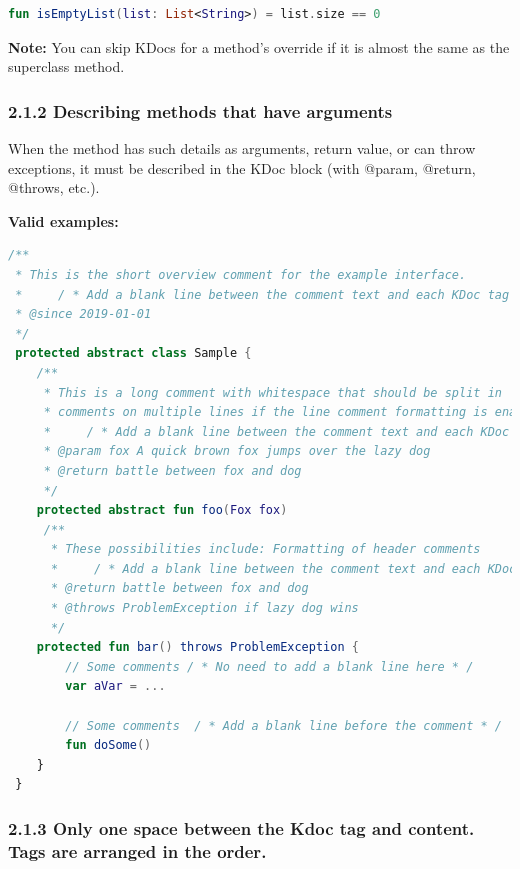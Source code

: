 \begin{lstlisting}[language=Kotlin]
fun isEmptyList(list: List<String>) = list.size == 0
\end{lstlisting}


\textbf{Note:} You can skip KDocs for a method's override if it is almost the same as the superclass method.



\subsubsection*{\textbf{2.1.2 Describing methods that have arguments}}
\leavevmode\newline



When the method has such details as arguments, return value, or can throw exceptions, it must be described in the KDoc block (with @param, @return, @throws, etc.).



\textbf{Valid examples:}



\begin{lstlisting}[language=Kotlin]
/** 
 * This is the short overview comment for the example interface.
 *     / * Add a blank line between the comment text and each KDoc tag underneath * /
 * @since 2019-01-01
 */
 protected abstract class Sample {
    /**
     * This is a long comment with whitespace that should be split in 
     * comments on multiple lines if the line comment formatting is enabled.
     *     / * Add a blank line between the comment text and each KDoc tag underneath * /
     * @param fox A quick brown fox jumps over the lazy dog
     * @return battle between fox and dog 
     */
    protected abstract fun foo(Fox fox)
     /**
      * These possibilities include: Formatting of header comments
      *     / * Add a blank line between the comment text and each KDoc tag underneath * /
      * @return battle between fox and dog
      * @throws ProblemException if lazy dog wins
      */
    protected fun bar() throws ProblemException {
        // Some comments / * No need to add a blank line here * /   
        var aVar = ...

        // Some comments  / * Add a blank line before the comment * /   
        fun doSome()
    }
 }
\end{lstlisting}


\subsubsection*{\textbf{2.1.3 Only one space between the Kdoc tag and content. Tags are arranged in the order.}}
\leavevmode\newline



